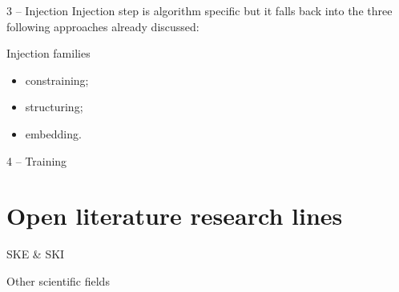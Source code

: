 \documentclass[presentation]{beamer}\mode<presentation>{\usetheme{AMSBolognaFC}}
\begin{document}
\begin{frame}[c]{3 -- Injection}
    Injection step is algorithm specific but it falls back into the three following approaches already discussed:
    \begin{block}{Injection families}
        \begin{itemize}
            \item constraining;
            \item structuring;
            \item embedding.
        \end{itemize}
    \end{block}
\end{frame}

\begin{frame}[c]{4 -- Training}
\end{frame}

\section{Open literature research lines}


\begin{frame}[c]{SKE \& SKI}
\end{frame}


\begin{frame}[c]{Other scientific fields}
\end{frame}

\section*{}

\frame{\titlepage}

\section*{\refname}

\begin{frame}[c,noframenumbering]{\refname}
	\scriptsize
	
	
\end{frame}

\end{document}
